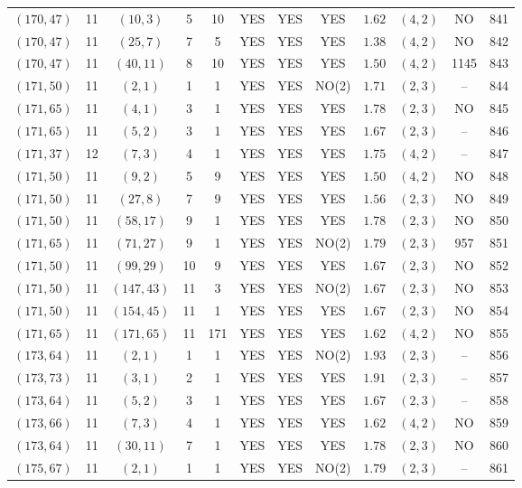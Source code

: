 \begin{longtable}{|c|c|c|c|c|c|c|c|c|c|c|c|}
$(170,47)$ & 11 & $(10,3)$ & 5 & 10 & YES & YES & YES & $1.62$ & $(4,2)$ & NO & 841\\
$(170,47)$ & 11 & $(25,7)$ & 7 & 5 & YES & YES & YES & $1.38$ & $(4,2)$ & NO & 842\\
$(170,47)$ & 11 & $(40,11)$ & 8 & 10 & YES & YES & YES & $1.50$ & $(4,2)$ & 1145 & 843\\
$(171,50)$ & 11 & $(2,1)$ & 1 & 1 & YES & YES & NO(2) & $1.71$ & $(2,3)$ & -- & 844\\
$(171,65)$ & 11 & $(4,1)$ & 3 & 1 & YES & YES & YES & $1.78$ & $(2,3)$ & NO & 845\\
$(171,65)$ & 11 & $(5,2)$ & 3 & 1 & YES & YES & YES & $1.67$ & $(2,3)$ & -- & 846\\
$(171,37)$ & 12 & $(7,3)$ & 4 & 1 & YES & YES & YES & $1.75$ & $(4,2)$ & -- & 847\\
$(171,50)$ & 11 & $(9,2)$ & 5 & 9 & YES & YES & YES & $1.50$ & $(4,2)$ & NO & 848\\
$(171,50)$ & 11 & $(27,8)$ & 7 & 9 & YES & YES & YES & $1.56$ & $(2,3)$ & NO & 849\\
$(171,50)$ & 11 & $(58,17)$ & 9 & 1 & YES & YES & YES & $1.78$ & $(2,3)$ & NO & 850\\
$(171,65)$ & 11 & $(71,27)$ & 9 & 1 & YES & YES & NO(2) & $1.79$ & $(2,3)$ & 957 & 851\\
$(171,50)$ & 11 & $(99,29)$ & 10 & 9 & YES & YES & YES & $1.67$ & $(2,3)$ & NO & 852\\
$(171,50)$ & 11 & $(147,43)$ & 11 & 3 & YES & YES & NO(2) & $1.67$ & $(2,3)$ & NO & 853\\
$(171,50)$ & 11 & $(154,45)$ & 11 & 1 & YES & YES & YES & $1.67$ & $(2,3)$ & NO & 854\\
$(171,65)$ & 11 & $(171,65)$ & 11 & 171 & YES & YES & YES & $1.62$ & $(4,2)$ & NO & 855\\
$(173,64)$ & 11 & $(2,1)$ & 1 & 1 & YES & YES & NO(2) & $1.93$ & $(2,3)$ & -- & 856\\
$(173,73)$ & 11 & $(3,1)$ & 2 & 1 & YES & YES & YES & $1.91$ & $(2,3)$ & -- & 857\\
$(173,64)$ & 11 & $(5,2)$ & 3 & 1 & YES & YES & YES & $1.67$ & $(2,3)$ & -- & 858\\
$(173,66)$ & 11 & $(7,3)$ & 4 & 1 & YES & YES & YES & $1.62$ & $(4,2)$ & NO & 859\\
$(173,64)$ & 11 & $(30,11)$ & 7 & 1 & YES & YES & YES & $1.78$ & $(2,3)$ & NO & 860\\
$(175,67)$ & 11 & $(2,1)$ & 1 & 1 & YES & YES & NO(2) & $1.79$ & $(2,3)$ & -- & 861\\

\end{longtable}
